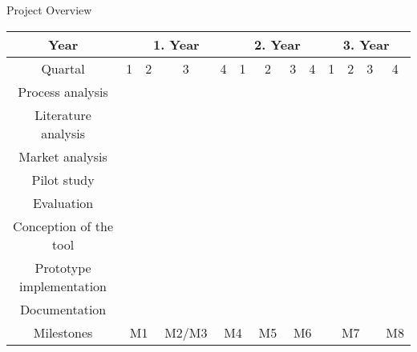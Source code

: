 \documentclass[aspectratio=169,t]{beamer}
\begin{document}
  { 
    \begin{frame}{Project Overview}
    \begin{table}
    \centering
    \begin{tabular}{|c||c|c|c|c|c|c|c|c|c|c|c|c|}
       \hline
       Year & \multicolumn{4}{c|}{1. Year} & \multicolumn{4}{c|}{2. Year} & \multicolumn{4}{c|}{3. Year}\\
       \hline
       Quartal & 1 & 2 & 3 & 4 & 1 & 2 & 3 & 4 & 1 & 2 & 3 & 4\\
       \hline
       Process analysis & \cellcolor{azure} & \cellcolor{azure} &&&&&&&&&&\\
       Literature analysis &\cellcolor{azure}&\cellcolor{azure}&\cellcolor{azure}&\cellcolor{gray!20}&\cellcolor{gray!20}&\cellcolor{gray!20}&\cellcolor{gray!20}&\cellcolor{gray!20}&\cellcolor{gray!20}&\cellcolor{gray!20}&\cellcolor{gray!20}&\\
       Market analysis &\cellcolor{azure}&\cellcolor{azure}&\cellcolor{azure}&\cellcolor{gray!20}&\cellcolor{gray!20}&\cellcolor{gray!20}&\cellcolor{gray!20}&\cellcolor{gray!20}&\cellcolor{gray!20}&\cellcolor{gray!20}&\cellcolor{gray!20}&\\
       Pilot study &&&&\cellcolor{azure}&\cellcolor{azure}&&&&&&&\\
       Evaluation &&&&&\cellcolor{azure}&\cellcolor{azure!50}&&&&&&\\
       Conception of the tool &&\cellcolor{gray!20}&\cellcolor{gray!20}&\cellcolor{gray!20}&\cellcolor{gray!20}&\cellcolor{gray!20}&\cellcolor{azure!50}&\cellcolor{azure!50}&\cellcolor{gray!20}&\cellcolor{gray!20}&\cellcolor{gray!20}&\\
       Prototype implementation &&&&&&&&\cellcolor{gray!20}&\cellcolor{azure!50}&\cellcolor{azure!50}&\cellcolor{azure!50}&\\
       Documentation &&\cellcolor{gray!20}&\cellcolor{gray!20}&\cellcolor{gray!20}&\cellcolor{gray!20}&\cellcolor{gray!20}&\cellcolor{gray!20}&\cellcolor{gray!20}&\cellcolor{gray!20}&\cellcolor{azure!50}&\cellcolor{azure!50}&\cellcolor{azure!50}\\
       \hline
       Milestones & \multicolumn{2}{c|}{M1} & M2/M3 & \multicolumn{2}{c|}{M4} & \multicolumn{1}{c|}{M5} & \multicolumn{2}{c|}{M6} & \multicolumn{3}{c|}{M7} & M8\\
       \hline
    \end{tabular}
    \end{table}
    \end{frame}
  }
\end{document}
